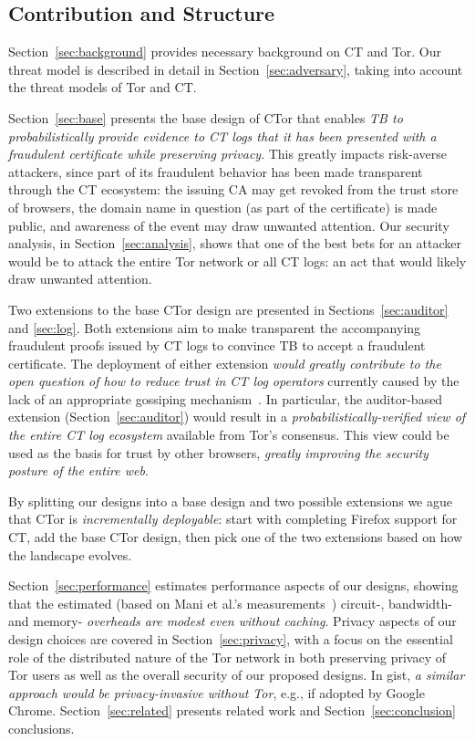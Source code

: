 \subsection{Contribution and Structure}
Section~\ref{sec:background} provides necessary background on CT and Tor. Our
threat model is described in detail in Section~\ref{sec:adversary}, taking into
account the threat models of Tor and CT\@.

Section~\ref{sec:base} presents the base design of CTor that enables \emph{TB to
probabilistically provide evidence to CT logs that it has been presented with a
fraudulent certificate while preserving privacy}. This greatly impacts
risk-averse attackers, since part of its fraudulent behavior has been made
transparent through the CT ecosystem: the issuing CA may get revoked from the
trust store of browsers, the domain name in question (as part of the
certificate) is made public, and awareness of the event may draw unwanted
attention. Our security analysis, in Section~\ref{sec:analysis}, shows that one
of the best bets for an attacker would be to attack the entire Tor network or
all CT logs: an act that would likely draw unwanted attention.

Two extensions to the base CTor design are presented in
Sections~\ref{sec:auditor} and \ref{sec:log}. Both extensions aim to make
transparent the accompanying fraudulent proofs issued by CT logs to convince TB
to accept a fraudulent certificate. The deployment of either extension
\emph{would greatly contribute to the open question of how to reduce trust in CT
log operators} currently caused by the lack of an appropriate gossiping
mechanism~\cite{minimal-gossip,nordberg}. In particular, the auditor-based
extension (Section~\ref{sec:auditor}) would result in a
\emph{probabilistically-verified view of the entire CT log ecosystem} available
from Tor's consensus. This view could be used as the basis for trust by other
browsers, \emph{greatly improving the security posture of the entire web}.

By splitting our designs into a base design and two possible extensions we ague
that CTor is \emph{incrementally deployable}: start with completing Firefox
support for CT, add the base CTor design, then pick one of the two extensions
based on how the landscape evolves.

Section~\ref{sec:performance} estimates performance aspects of our designs,
showing that the estimated (based on Mani et al.'s measurements~\cite{mani})
circuit-, bandwidth- and memory- \emph{overheads are modest even without
caching}. Privacy aspects of our design choices are covered in
Section~\ref{sec:privacy}, with a focus on the essential role of the distributed
nature of the Tor network in both preserving privacy of Tor users as well as the
overall security of our proposed designs. In gist, \emph{a similar approach
would be privacy-invasive without Tor}, e.g., if adopted by Google Chrome.
Section~\ref{sec:related} presents related work and Section~\ref{sec:conclusion}
conclusions.

